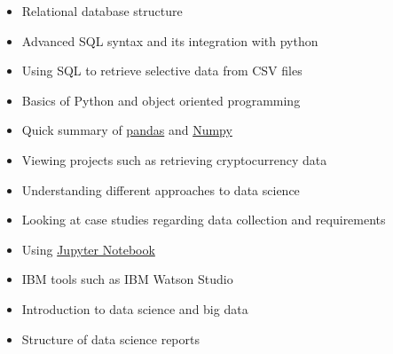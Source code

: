\documentclass[11pt,a4paper,ragged2e]{altacv}
\begin{document}
\begin{paracol}{1}
\begin{itemize}
\item Relational database structure
\item Advanced SQL syntax and its integration with python
\item Using SQL to retrieve selective data from CSV files
\end{itemize}
\tightdivider

\begin{itemize}
\item Basics of Python and object oriented programming
\item Quick summary of \href{https://pandas.pydata.org/}{pandas} and \href{https://numpy.org/}{Numpy}
\item Viewing projects such as retrieving cryptocurrency data
\end{itemize}
\tightdivider

\begin{itemize}
\item Understanding different approaches to data science
\item Looking at case studies regarding data collection and requirements
\end{itemize}
\tightdivider

\begin{itemize}
\item Using \href{https://jupyter.org/}{Jupyter Notebook}
\item IBM tools such as IBM Watson Studio
\end{itemize}
\tightdivider

\begin{itemize}
\item Introduction to data science and big data
\item Structure of data science reports
\end{itemize}
\tightdivider


\end{paracol}
\end{document}
